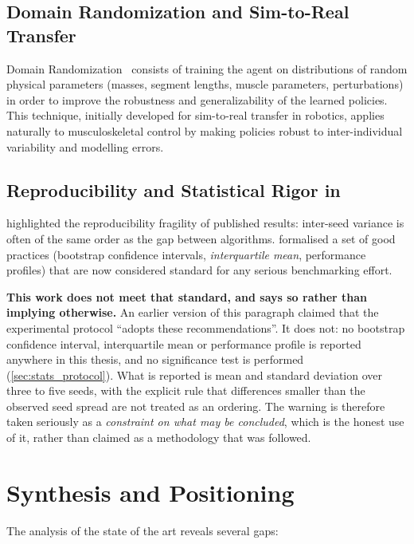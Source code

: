\subsection{Domain Randomization and Sim-to-Real Transfer}

Domain Randomization~\parencite{Tobin2017, Peng2018SimToReal} consists of training
the agent on distributions of random physical parameters (masses, segment lengths,
muscle parameters, perturbations) in order to improve the robustness and
generalizability of the learned policies. This technique, initially developed for
sim-to-real transfer in robotics, applies naturally to musculoskeletal control by
making policies robust to inter-individual variability and modelling errors.

\subsection{Reproducibility and Statistical Rigor in \DRL{}}

\textcite{Henderson2018} highlighted the reproducibility fragility of published
\DRL{} results: inter-seed variance is often of the same order as the gap between
algorithms. \textcite{Agarwal2021} formalised a set of good practices (bootstrap
confidence intervals, \textit{interquartile mean}, performance profiles) that are
now considered standard for any serious benchmarking effort.

\textbf{This work does not meet that standard, and says so rather than implying
otherwise.} An earlier version of this paragraph claimed that the experimental
protocol ``adopts these recommendations''. It does not: no bootstrap confidence
interval, interquartile mean or performance profile is reported anywhere in this
thesis, and no significance test is performed
(\cref{sec:stats_protocol}). What is reported is mean and standard deviation over
three to five seeds, with the explicit rule that differences smaller than the
observed seed spread are not treated as an ordering. The
\textcite{Henderson2018} warning is therefore taken seriously as a
\emph{constraint on what may be concluded}, which is the honest use of it, rather
than claimed as a methodology that was followed.

\section{Synthesis and Positioning}

The analysis of the state of the art reveals several gaps:

